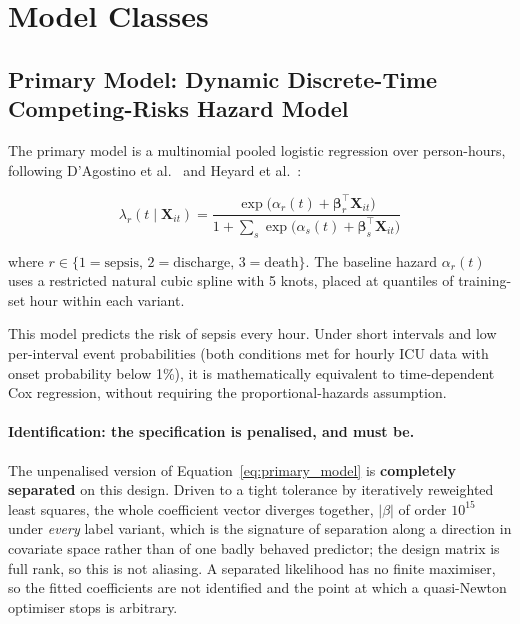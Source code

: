 \section{Model Classes}
\label{sec:models}

\subsection[Primary Model: Dynamic Discrete-Time Competing-Risks Hazard Model]%
{Primary Model: Dynamic Discrete-Time Compet\-ing-Risks Hazard Model}
\label{sec:primary_model_spec}

The primary model is a multinomial pooled logistic regression over person-hours,
following D'Agostino et al.\ \cite{dagostino1990pooled} and Heyard et al.\
\cite{heyard2019dynamic}:

\begin{equation}
    \lambda_r(t \mid \mathbf{X}_{it}) =
    \frac{\exp\!\bigl(\alpha_r(t) + \boldsymbol{\beta}_r^\top \mathbf{X}_{it}\bigr)}
    {1 + \sum_{s} \exp\!\bigl(\alpha_s(t) + \boldsymbol{\beta}_s^\top \mathbf{X}_{it}\bigr)}
    \label{eq:primary_model}
\end{equation}

where $r \in \{1=\text{sepsis},\, 2=\text{discharge},\, 3=\text{death}\}$.
The baseline hazard $\alpha_r(t)$ uses a restricted natural cubic spline with
5 knots, placed at quantiles of training-set hour within each variant.

This model predicts the risk of sepsis every hour. Under short intervals
and low per-interval event probabilities (both conditions met for hourly ICU
data with onset probability below 1\%), it is mathematically equivalent to
time-dependent Cox regression, without requiring the proportional-hazards
assumption.

\paragraph{Identification: the specification is penalised, and must be.}
The unpenalised version of Equation~\eqref{eq:primary_model} is
\textbf{completely separated} on this design. Driven to a tight tolerance by
iteratively reweighted least squares, the whole coefficient vector diverges
together, $|\beta|$ of order $10^{15}$ under \emph{every} label variant,
which is the signature of separation along a direction in covariate space rather
than of one badly behaved predictor; the design matrix is full rank, so this is
not aliasing. A separated likelihood has no finite maximiser, so the fitted
coefficients are not identified and the point at which a quasi-Newton optimiser
stops is arbitrary.

